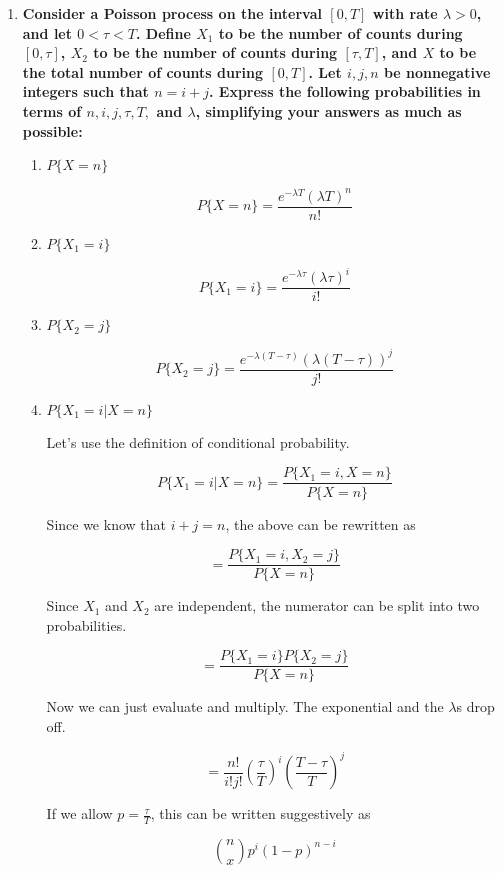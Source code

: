 \documentclass{article}
\begin{document}
\begin{enumerate}[label=(\alph*)]
    \item \textbf{Consider a Poisson process on the interval $[0, T]$ with rate $\lambda > 0$, and let $0 < \tau < T$. Define $X_1$ to be the number of counts during $[0, \tau]$, $X_2$ to be the number of counts during $[\tau, T]$, and $X$ to be the total number of counts during $[0, T]$. Let $i, j, n$ be nonnegative integers such that $n = i + j$. Express the following probabilities in terms of $n, i, j, \tau, T, $ and $\lambda$, simplifying your answers as much as possible:}

    \begin{enumerate}[label=(\roman*)]
        \item \textbf{$P\{X = n\}$}

        $$P\{X = n\} = \boxed{\frac{e^{-\lambda T}(\lambda T)^n}{n!}}$$
        
        \item \textbf{$P\{X_1 = i\}$}

        $$P\{X_1 = i\} = \boxed{\frac{e^{-\lambda \tau}(\lambda \tau)^i}{i!}}$$
        
        \item \textbf{$P\{X_2 = j\}$}

        $$P\{X_2 = j\} = \boxed{\frac{e^{-\lambda (T - \tau)}(\lambda (T - \tau))^j}{j!}}$$
        
        \item \textbf{$P\{X_1 = i \vert X = n\}$}

        Let's use the definition of conditional probability.

        $$P\{X_1 = i \vert X = n\} = \frac{P\{X_1 = i, X = n\}}{P\{X = n\}}$$

        Since we know that $i + j = n$, the above can be rewritten as

        $$= \frac{P\{X_1 = i, X_2 = j\}}{P\{X = n\}}$$

        Since $X_1$ and $X_2$ are independent, the numerator can be split into two probabilities.

        $$= \frac{P\{X_1 = i\} P\{X_2 = j\}}{P\{X = n\}}$$

        Now we can just evaluate and multiply. The exponential and the $\lambda$s drop off.

        $$= \frac{n!}{i!j!} \left( \frac{\tau}{T} \right)^i \left(\frac{T - \tau}{T} \right)^j$$

        If we allow $p = \frac{\tau}{T}$, this can be written suggestively as

        $$\boxed{{n \choose x} p^i (1 - p)^{n - i}}$$


\end{enumerate}
\end{enumerate}
\end{document}
